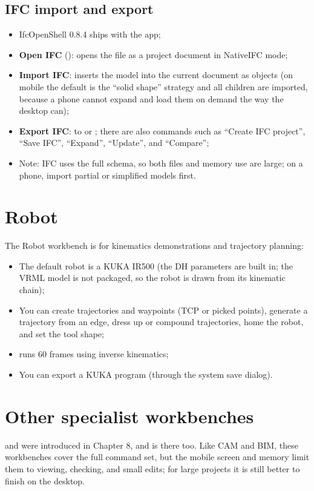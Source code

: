 \subsection{IFC import and export}

\begin{itemize}
  \item IfcOpenShell 0.8.4 ships with the app;
  \item \textbf{Open IFC} (): opens the file as a project document in NativeIFC mode;
  \item \textbf{Import IFC}: inserts the model into the current document as objects (on mobile the default is the
        ``solid shape'' strategy and all children are imported, because a phone cannot expand and load them
        on demand the way the desktop can);
  \item \textbf{Export IFC}: to  or ; there are also commands such as ``Create IFC project'',
        ``Save IFC'', ``Expand'', ``Update'', and ``Compare'';
  \item Note: IFC uses the full schema, so both files and memory use are large; on a phone, import partial or
        simplified models first.
\end{itemize}

\section{Robot}

The Robot workbench is for kinematics demonstrations and trajectory planning:

\begin{itemize}
  \item The default robot is a KUKA IR500 (the DH parameters are built in; the VRML model is not packaged,
        so the robot is drawn from its kinematic chain);
  \item You can create trajectories and waypoints (TCP or picked points), generate a trajectory from an edge,
        dress up or compound trajectories, home the robot, and set the tool shape;
  \item {} runs 60 frames using inverse kinematics;
  \item You can export a KUKA  program (through the system save dialog).
\end{itemize}

\section{Other specialist workbenches}

 and  were introduced in Chapter 8, and  is there too.
Like CAM and BIM, these workbenches cover the full command set, but the mobile screen and memory limit them
to viewing, checking, and small edits; for large projects it is still better to finish on the desktop.
